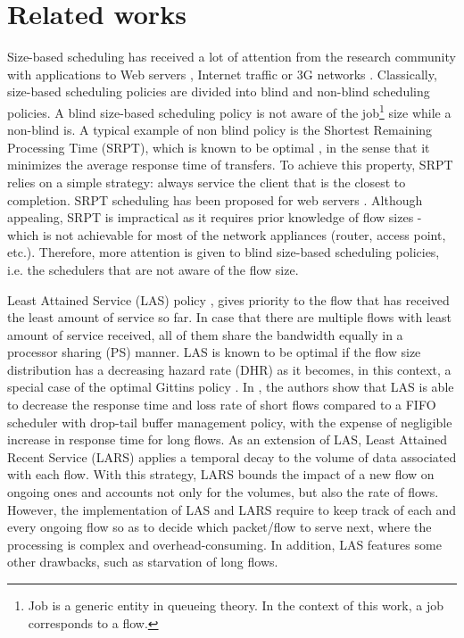 \documentclass[preprint,12pt]{elsarticle}
\begin{document}
\section{Related works}
\label{sec:related}
Size-based scheduling has received a lot of attention from the research community with applications to Web servers \cite{SRPT_Web2006}, Internet traffic \cite{Avrachenkov04Run2c,Rai2004Performance,Keller2008Improving} or 3G networks \cite{Aalto2007Impact,Lassila2008Combining}. Classically, size-based scheduling policies are divided into blind and non-blind scheduling policies. A blind size-based scheduling policy is not aware of the job\footnote{Job is a generic entity in queueing theory. In the context of this work, a job corresponds to a flow.} size while a non-blind is. A typical example of non blind policy is the Shortest Remaining Processing Time (SRPT), which is known to be optimal \cite{Schrage1968SRPT}, in the sense that it minimizes the average response time of transfers. To achieve this property, SRPT relies on a simple strategy: always service the client that is the closest to completion. SRPT scheduling has been proposed for web servers \cite{Chen03cnetworks,Harchol2003}. Although appealing, SRPT is impractical as it requires prior knowledge of flow sizes - which is not achievable for most of the network appliances (router, access point, etc.). Therefore, more attention is given to blind size-based scheduling policies, i.e. the schedulers that are not aware of the flow size.

 Least Attained Service (LAS) policy \cite{Rai02size-basedscheduling}, gives priority to the flow that has received the least amount of service so far. In case that there are multiple flows with least amount of service received, all of them share the bandwidth equally in a processor sharing (PS) manner. LAS is known to be optimal if the flow size distribution has a decreasing hazard rate (DHR) \cite{Nuyens2008FB} as it becomes, in this context, a special case of the optimal Gittins policy \cite{Gittins89}. In \cite{Rai02size-basedscheduling,Rai04size-basedscheduling,Rai04performancemodels}, the authors show that LAS is able to decrease the response time and loss rate of short flows compared to a FIFO scheduler with drop-tail buffer management policy, with the expense of negligible increase in response time for long flows. As an extension of LAS, Least Attained Recent Service (LARS) \cite{Martin10Lars} applies a temporal decay to the volume of data associated with each flow. With this strategy, LARS bounds the impact of a new flow on ongoing ones and accounts not only for the volumes, but also the rate of flows. However, the implementation of LAS and LARS require to keep track of each and every ongoing flow so as to decide which packet/flow to serve next, where the processing is complex and overhead-consuming. In addition, LAS features some other drawbacks, such as starvation of long flows.%
\end{document}
